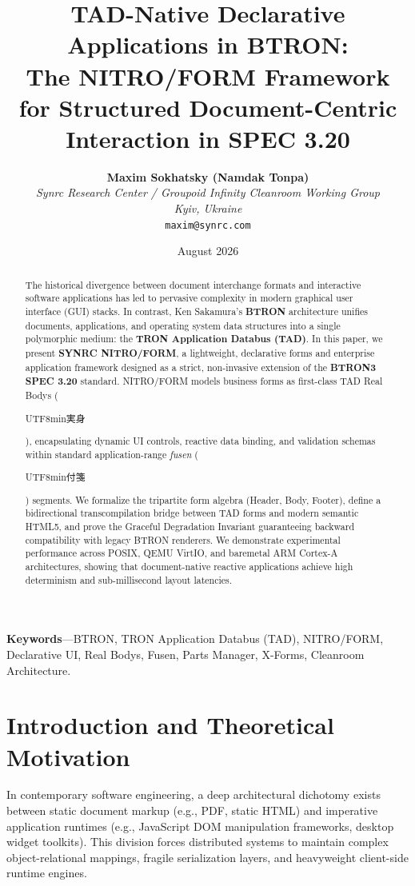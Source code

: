 \documentclass[10pt,journal,compsoc,twocolumn]{article}
\title{\LARGE \textbf{TAD-Native Declarative Applications in BTRON:\\The NITRO/FORM Framework for Structured Document-Centric Interaction in SPEC 3.20}}
\author{
    \textbf{Maxim Sokhatsky (Namdak Tonpa)}\\[0.3em]
    \small \textit{Synrc Research Center / Groupoid Infinity Cleanroom Working Group}\\
    \small \textit{Kyiv, Ukraine}\\
    \small \texttt{maxim@synrc.com}
}
\date{August 2026}
\newcommand{\ja}[1]{\begin{CJK*}{UTF8}{min}#1\end{CJK*}}
\begin{document}
\maketitle

\begin{abstract}
The historical divergence between document interchange formats and interactive software applications has led to pervasive complexity in modern graphical user interface (GUI) stacks. In contrast, Ken Sakamura's \textbf{BTRON} architecture unifies documents, applications, and operating system data structures into a single polymorphic medium: the \textbf{TRON Application Databus (TAD)}. In this paper, we present \textbf{SYNRC NITRO/FORM}, a lightweight, declarative forms and enterprise application framework designed as a strict, non-invasive extension of the \textbf{BTRON3 SPEC 3.20} standard. NITRO/FORM models business forms as first-class TAD Real Bodys (\ja{実身}), encapsulating dynamic UI controls, reactive data binding, and validation schemas within standard application-range \emph{fusen} (\ja{付箋}) segments. We formalize the tripartite form algebra (Header, Body, Footer), define a bidirectional transcompilation bridge between TAD forms and modern semantic HTML5, and prove the Graceful Degradation Invariant guaranteeing backward compatibility with legacy BTRON renderers. We demonstrate experimental performance across POSIX, QEMU VirtIO, and baremetal ARM Cortex-A architectures, showing that document-native reactive applications achieve high determinism and sub-millisecond layout latencies.
\end{abstract}

\noindent\textbf{\small Keywords}---BTRON, TRON Application Databus (TAD), NITRO/FORM, Declarative UI, Real Bodys, Fusen, Parts Manager, X-Forms, Cleanroom Architecture.

\section{Introduction and Theoretical Motivation}
\label{sec:intro}

In contemporary software engineering, a deep architectural dichotomy exists between static document markup (e.g., PDF, static HTML) and imperative application runtimes (e.g., JavaScript DOM manipulation frameworks, desktop widget toolkits). This division forces distributed systems to maintain complex object-relational mappings, fragile serialization layers, and heavyweight client-side runtime engines.
\end{document}
